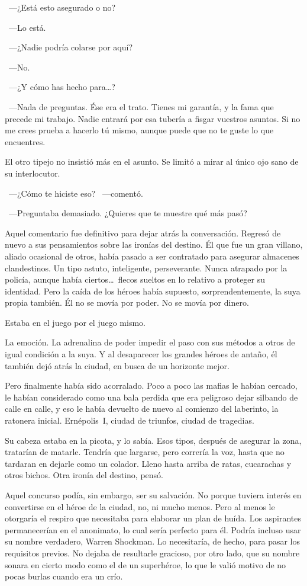 ~---¿Está esto asegurado o no?

~---Lo está.

~---¿Nadie podría colarse por aquí?

~---No.

~---¿Y cómo has hecho para\dots?

~---Nada de preguntas. Ése era el trato. Tienes mi garantía, y la fama que precede mi trabajo. Nadie entrará por esa tubería a fisgar vuestros asuntos. Si no me crees prueba a hacerlo tú mismo, aunque puede que no te guste lo que encuentres.

El otro tipejo no insistió más en el asunto. Se limitó a mirar al único ojo sano de su interlocutor.

~---¿Cómo te hiciste eso? ~---comentó.

~---Preguntaba demasiado. ¿Quieres que te muestre qué más pasó?

Aquel comentario fue definitivo para dejar atrás la conversación. Regresó de nuevo a sus pensamientos sobre las ironías del destino. Él que fue un gran villano, aliado ocasional de otros, había pasado a ser contratado para asegurar almacenes clandestinos. Un tipo astuto, inteligente, perseverante. Nunca atrapado por la policía, aunque había ciertos\dots\ flecos sueltos en lo relativo a proteger su identidad. Pero la caída de los héroes había supuesto, sorprendentemente, la suya propia también. Él no se movía por poder. No se movía por dinero.

Estaba en el juego por el juego mismo.

La emoción. La adrenalina de poder impedir el paso con sus métodos a otros de igual condición a la suya. Y al desaparecer los grandes héroes de antaño, él también dejó atrás la ciudad, en busca de un horizonte mejor.

Pero finalmente había sido acorralado. Poco a poco las mafias le habían cercado, le habían considerado como una bala perdida que era peligroso dejar silbando de calle en calle, y eso le había devuelto de nuevo al comienzo del laberinto, la ratonera inicial. Ernépolis~I, ciudad de triunfos, ciudad de tragedias.

Su cabeza estaba en la picota, y lo sabía. Esos tipos, después de asegurar la zona, tratarían de matarle. Tendría que largarse, pero correría la voz, hasta que no tardaran en dejarle como un colador. Lleno hasta arriba de ratas, cucarachas y otros bichos. Otra ironía del destino, pensó.

Aquel concurso podía, sin embargo, ser su salvación. No porque tuviera interés en convertirse en el héroe de la ciudad, no, ni mucho menos. Pero al menos le otorgaría el respiro que necesitaba para elaborar un plan de huída. Los aspirantes permanecerían en el anonimato, lo cual sería perfecto para él. Podría incluso usar su nombre verdadero, Warren Shockman. Lo necesitaría, de hecho, para pasar los requisitos previos. No dejaba de resultarle gracioso, por otro lado, que su nombre sonara en cierto modo como el de un superhéroe, lo que le valió motivo de no pocas burlas cuando era un crío.


